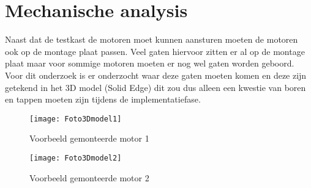 \section{Mechanische analysis}

Naast dat de testkast de motoren moet kunnen aansturen moeten de motoren ook op de montage plaat passen. Veel gaten hiervoor zitten er al op de montage plaat maar voor sommige motoren moeten er nog wel gaten worden geboord. Voor dit onderzoek is er onderzocht waar deze gaten moeten komen en deze zijn getekend in het 3D model (Solid Edge) dit zou dus alleen een kwestie van boren en tappen moeten zijn tijdens de implementatiefase.

\begin{figure}[H]
	\centering
	\texttt{[image: Foto3Dmodel1]}
	\label{fig:3Dmodel1}
	\caption{Voorbeeld gemonteerde motor 1}
\end{figure}

\begin{figure}[H]
	\centering
	\texttt{[image: Foto3Dmodel2]}
	\label{fig:3Dmodel2}
	\caption{Voorbeeld gemonteerde motor 2}
\end{figure}